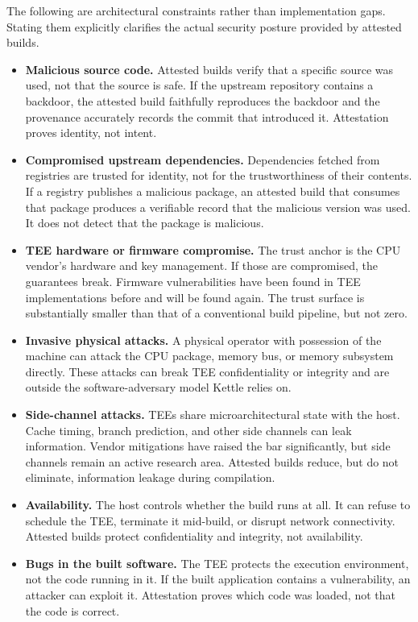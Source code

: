 \documentclass[11pt]{article}
\begin{document}
The following are architectural constraints rather than implementation gaps. Stating them explicitly clarifies the actual security posture provided by attested builds.

\begin{itemize}
\item \textbf{Malicious source code.} Attested builds verify that a specific source was used, not that the source is safe. If the upstream repository contains a backdoor, the attested build faithfully reproduces the backdoor and the provenance accurately records the commit that introduced it. Attestation proves identity, not intent.
\item \textbf{Compromised upstream dependencies.} Dependencies fetched from registries are trusted for identity, not for the trustworthiness of their contents. If a registry publishes a malicious package, an attested build that consumes that package produces a verifiable record that the malicious version was used. It does not detect that the package is malicious.
\item \textbf{TEE hardware or firmware compromise.} The trust anchor is the CPU vendor's hardware and key management. If those are compromised, the guarantees break. Firmware vulnerabilities have been found in TEE implementations before and will be found again. The trust surface is substantially smaller than that of a conventional build pipeline, but not zero.
\item \textbf{Invasive physical attacks.} A physical operator with possession of the machine can attack the CPU package, memory bus, or memory subsystem directly. These attacks can break TEE confidentiality or integrity and are outside the software-adversary model Kettle relies on.
\item \textbf{Side-channel attacks.} TEEs share microarchitectural state with the host. Cache timing, branch prediction, and other side channels can leak information. Vendor mitigations have raised the bar significantly, but side channels remain an active research area. Attested builds reduce, but do not eliminate, information leakage during compilation.
\item \textbf{Availability.} The host controls whether the build runs at all. It can refuse to schedule the TEE, terminate it mid-build, or disrupt network connectivity. Attested builds protect confidentiality and integrity, not availability.
\item \textbf{Bugs in the built software.} The TEE protects the execution environment, not the code running in it. If the built application contains a vulnerability, an attacker can exploit it. Attestation proves which code was loaded, not that the code is correct.
\end{itemize}
\end{document}
